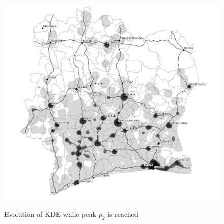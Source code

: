 \begin{figure}
{    \includegraphics[scale = 0.3]{results/images/kernel/l_hour19_kd.pdf}
	\label{fig:subfig1}
}
\caption[KDE evolution while peak $p_2$ is reached]{Evolution of KDE while peak $p_2$ is reached}
\label{fig:subfigureExample}
\end{figure}







